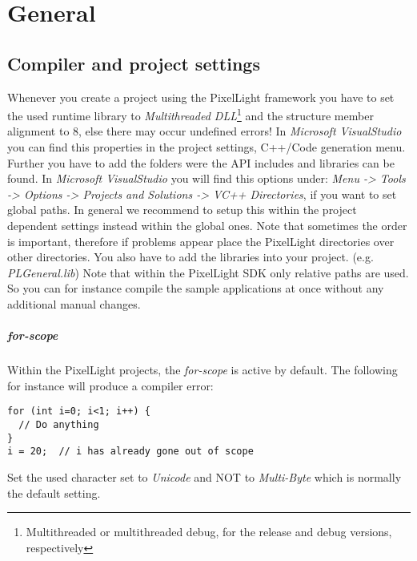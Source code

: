 \chapter{General}




\section{Compiler and project settings}
Whenever you create a project using the PixelLight framework you have to set the used runtime library to \emph{Multithreaded DLL}\footnote{Multithreaded or multithreaded debug, for the release and debug versions, respectively} and the structure member alignment to 8, else there may occur undefined errors! In \emph{Microsoft VisualStudio} you can find this properties in the project settings, C++/Code generation menu. Further you have to add the folders were the API includes and libraries can be found. In \emph{Microsoft VisualStudio} you will find this options under: \emph{Menu -> Tools -> Options -> Projects and Solutions -> VC++ Directories}, if you want to set global paths. In general we recommend to setup this within the project dependent settings instead within the global ones. Note that sometimes the order is important, therefore if problems appear place the PixelLight directories over other directories. You also have to add the libraries into your project. (e.g. \emph{PLGeneral.lib}) Note that within the PixelLight SDK only relative paths are used. So you can for instance compile the sample applications at once without any additional manual changes.


\paragraph{for-scope}
Within the PixelLight projects, the \emph{for-scope} is active by default. The following for instance will produce a compiler error:
\begin{lstlisting}[caption=for-scope]
for (int i=0; i<1; i++) {
  // Do anything
}
i = 20;  // i has already gone out of scope
\end{lstlisting}
Set the used character set to \emph{Unicode} and NOT to \emph{Multi-Byte} which is normally the default setting.




